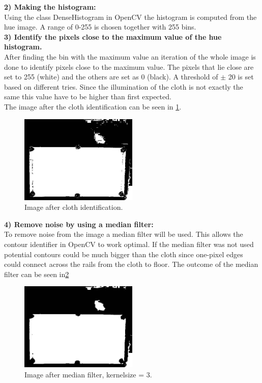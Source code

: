 \textbf{2) Making the histogram:}\\
Using the class DenseHistogram in OpenCV\cite{opencv} the histogram is computed from the hue image. A range of 0-255 is chosen together with 255 bins.\\

\textbf{3) Identify the pixels close to the maximum value of the hue histogram.}\\
After finding the bin with the maximum value an iteration of the whole image is done to identify pixels close to the maximum value. The pixels that lie close are set to 255 (white) and the others are set as 0 (black). A threshold of $\pm$ 20 is set based on different tries. Since the illumination of the cloth is not exactly the same this value have to be higher than first expected.\\

The image after the cloth identification can be seen in \ref{fig:aftercloth}.

\begin{figure}[H]
\begin{center}
\leavevmode
\includegraphics[width=0.5\textwidth]{images/aftercloth}
\end{center}
\caption{Image after cloth identification.}
\label{fig:aftercloth}
\end{figure}

\textbf{4) Remove noise by using a median filter:}\\
To remove noise from the image a median filter will be used. This allows the contour identifier in OpenCV\cite{opencv} to work optimal. If the median filter was not used potential contours could be much bigger than the cloth since one-pixel edges could connect across the rails from the cloth to floor. The outcome of the median filter can be seen in\ref{fig:afterclothmedian}

\begin{figure}[H]
\begin{center}
\leavevmode
\includegraphics[width=0.5\textwidth]{images/afterclothmedian}
\end{center}
\caption{Image after median filter, kernelsize = 3.}
\label{fig:afterclothmedian}
\end{figure}

